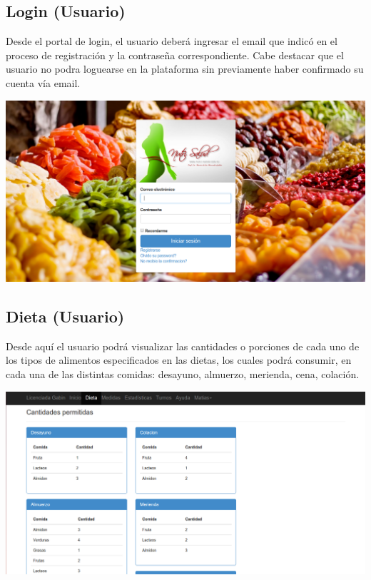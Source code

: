 \documentclass[runningheads,a4paper,spanish]{llncs}
\begin{document}
\subsection{Login (Usuario)}
Desde el portal de login, el usuario deberá ingresar el email que indicó en el proceso de registración y la contraseña correspondiente.  Cabe destacar que el usuario no podra loguearse en la plataforma sin previamente haber confirmado su cuenta vía email.
\begin{center}
	\includegraphics[scale=0.3]{login.png}
\end{center}
\subsection{Dieta (Usuario)}
Desde aquí el usuario podrá visualizar las cantidades o porciones de cada uno de los tipos de alimentos especificados en las dietas, los cuales podrá consumir, en cada una de las distintas comidas: desayuno, almuerzo, merienda, cena, colación.
\begin{center}
	\includegraphics[scale=0.3]{dietas_cantidades.png}
\end{center}
\end{document}
